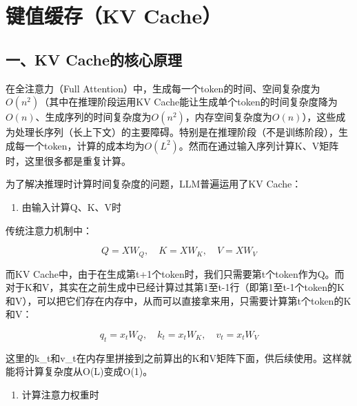 \setcounter{section}{0}

\hypertarget{ux952eux503cux7f13ux5b58kv-cache}{%
\section{键值缓存（KV Cache）}\label{ux952eux503cux7f13ux5b58kv-cache}}

\hypertarget{ux4e00kv-cacheux7684ux6838ux5fc3ux539fux7406}{%
\subsection{一、KV Cache的核心原理}\label{ux4e00kv-cacheux7684ux6838ux5fc3ux539fux7406}}

在全注意力（Full Attention）中，生成每一个token的时间、空间复杂度为\(O(n^2)\)（其中在推理阶段运用KV Cache能让生成单个token的时间复杂度降为\(O(n)\)、生成序列的时间复杂度为\(O(n^2)\)，内存空间复杂度为\(O(n)\)），这些成为处理长序列（长上下文）的主要障碍。特别是在推理阶段（不是训练阶段），生成每一个token，计算的成本均为\(O(L^2)\)。然而在通过输入序列计算K、V矩阵时，这里很多都是重复计算。

为了解决推理时计算时间复杂度的问题，LLM普遍运用了KV Cache：

\begin{enumerate}
\def\labelenumi{\arabic{enumi}.}
\tightlist
\item
  由输入计算Q、K、V时
\end{enumerate}

传统注意力机制中：

\[
Q = XW_Q,\quad K = XW_K,\quad V = XW_V
\]

而KV Cache中，由于在生成第t+1个token时，我们只需要第t个token作为Q。而对于K和V，其实在之前生成中已经计算过其第1至t-1行（即第1至t-1个token的K和V），可以把它们存在内存中，从而可以直接拿来用，只需要计算第t个token的K和V：

\[
q_t = x_tW_Q,\quad k_t = x_tW_K,\quad v_t = x_tW_V
\]

这里的k\_t和v\_t在内存里拼接到之前算出的K和V矩阵下面，供后续使用。这样就能将计算复杂度从O(L)变成O(1)。

\begin{enumerate}
\def\labelenumi{\arabic{enumi}.}
\setcounter{enumi}{1}
\tightlist
\item
  计算注意力权重时
\end{enumerate}

